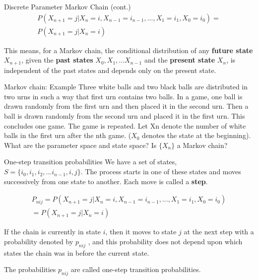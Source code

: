 \documentclass[12pt,ignorenonframetext,]{beamer}
\begin{document}
\begin{frame}{Discrete Parameter Markov Chain (cont.)}
\protect\hypertarget{discrete-parameter-markov-chain-cont.}{}
\begin{multline}
  P(X_{n+1}=j|X_n=i, X_{n-1}=i_{n-1}, ..., X_1=i_1, X_0=i_0) = \\  P(X_{n+1}=j|X_n=i) \tag{1}
\end{multline}

This means, for a Markov chain, the conditional distribution of any
\textbf{future state} \(X_{n+1}\), given the \textbf{past states}
\(X_0, X_1,...X_{n-1}\) and the \textbf{present state} \(X_n\), is
independent of the past states and depends only on the present state.
\end{frame}

\begin{frame}{Markov chain: Example}
\protect\hypertarget{markov-chain-example}{}
Three white balls and two black balls are distributed in two urns in
such a way that first urn contains two balls. In a game, one ball is
drawn randomly from the first urn and then placed it in the second urn.
Then a ball is drawn randomly from the second urn and placed it in the
first urn. This concludes one game. The game is repeated. Let Xn denote
the number of white balls in the first urn after the nth game. (\(X_0\)
denotes the state at the beginning). What are the parameter space and
state space? Is \(\{X_n\}\) a Markov chain?
\end{frame}

\begin{frame}{One-step transition probabilities}
\protect\hypertarget{one-step-transition-probabilities}{}
We have a set of states, \(S = \{i_0, i_1, i_2,...i_{n-1}, i, j\}\). The
process starts in one of these states and moves successively from one
state to another. Each move is called a \textbf{step}.

\begin{multline}
P_{nij} = P(X_{n+1}=j|X_n=i, X_{n-1}=i_{n-1}, ..., X_1=i_1, X_0=i_0)  \\ = P(X_{n+1}=j|X_n=i)
\end{multline}

If the chain is currently in state \(i\), then it moves to state \(j\)
at the next step with a probability denoted by \(p_{nij}\) , and this
probability does not depend upon which states the chain was in before
the current state.

The probabilities \(p_{nij}\) are called one-step transition
probabilities.
\end{frame}
\end{document}
